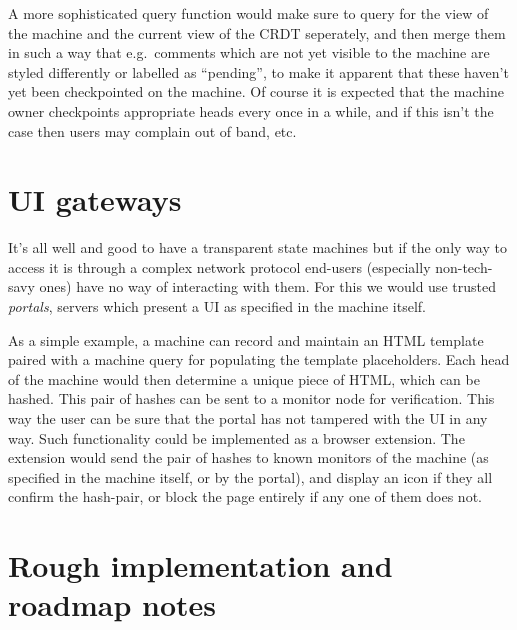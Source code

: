 \documentclass[a4paper, oneside, 10pt]{amsart}
\begin{document}
A more sophisticated query function would make sure to query for the view of the
machine and the current view of the CRDT seperately, and then merge them in such
a way that e.g.~comments which are not yet visible to the machine are styled
differently or labelled as ``pending'', to make it apparent that these haven't
yet been checkpointed on the machine. Of course it is expected that the machine
owner checkpoints appropriate heads every once in a while, and if this isn't the
case then users may complain out of band, etc.

\section{UI gateways}

It's all well and good to have a transparent state machines but if the only way
to access it is through a complex network protocol end-users (especially
non-tech-savy ones) have no way of interacting with them. For this we would use
trusted \emph{portals}, servers which present a UI as specified in the machine
itself.

As a simple example, a machine can record and maintain an HTML template paired
with a machine query for populating the template placeholders. Each head of the
machine would then determine a unique piece of HTML, which can be hashed. This
pair of hashes can be sent to a monitor node for verification. This way the user
can be sure that the portal has not tampered with the UI in any way. Such
functionality could be implemented as a browser extension. The extension would
send the pair of hashes to known monitors of the machine (as specified in the
machine itself, or by the portal), and display an icon if they all confirm the
hash-pair, or block the page entirely if any one of them does not.

\section{Rough implementation and roadmap notes}
\end{document}
